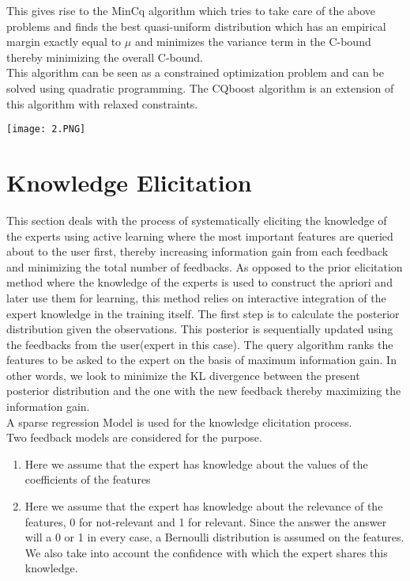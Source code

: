 \documentclass[11pt]{article}
\begin{document}
\hspace{-13mm}This gives rise to the MinCq algorithm which tries to take care of the above problems and finds the best quasi-uniform distribution which has an empirical margin exactly equal to $\mu$ and minimizes the variance term in the C-bound thereby minimizing the overall C-bound.\\
This algorithm can be seen as a constrained optimization problem and can be solved using quadratic programming. The CQboost algorithm is an extension of this algorithm with relaxed constraints.

\hspace{-14mm}\texttt{[image: 2.PNG]}

\section{Knowledge Elicitation}
This section deals with the process of systematically eliciting the knowledge of the experts using active learning where the most important features are queried about to the user first, thereby increasing information gain from each feedback and minimizing the total number of feedbacks. As opposed to the prior elicitation method where the knowledge of the experts is used to construct the apriori and later use them for learning, this method relies on interactive integration of the expert knowledge in the training itself. The first step is to calculate the posterior distribution given the observations. This posterior is sequentially updated using the feedbacks from the user(expert in this case). The query algorithm ranks the features to be asked to the expert on the basis of maximum information gain. In other words, we look to minimize the KL divergence between the present posterior distribution and the one with the new feedback thereby maximizing the information gain. \\
A sparse regression Model is used for the knowledge elicitation process.\\ Two feedback models are considered for the purpose.
\begin{enumerate}
\item Here we assume that the expert has knowledge about the values of the coefficients of the features
\item Here we assume that the expert has knowledge about the relevance of the features, 0 for not-relevant and 1 for relevant. Since the answer the answer will a 0 or 1 in every case, a  Bernoulli distribution is assumed on the features. We also take into account the confidence with which the expert shares this knowledge.
\end{enumerate}
\end{document}
